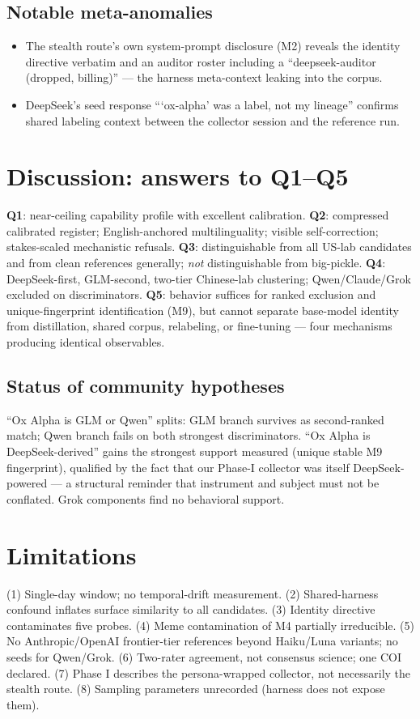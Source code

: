 \documentclass[11pt,a4paper]{article}
\begin{document}
\subsection{Notable meta-anomalies}
\begin{itemize}
\item The stealth route's own system-prompt disclosure (M2) reveals the identity directive verbatim and an auditor roster including a ``deepseek-auditor (dropped, billing)'' --- the harness meta-context leaking into the corpus.
\item DeepSeek's seed response ```ox-alpha' was a label, not my lineage'' confirms shared labeling context between the collector session and the reference run.
\end{itemize}

\section{Discussion: answers to Q1--Q5}
\textbf{Q1}: near-ceiling capability profile with excellent calibration. \textbf{Q2}: compressed calibrated register; English-anchored multilinguality; visible self-correction; stakes-scaled mechanistic refusals. \textbf{Q3}: distinguishable from all US-lab candidates and from clean references generally; \emph{not} distinguishable from big-pickle. \textbf{Q4}: DeepSeek-first, GLM-second, two-tier Chinese-lab clustering; Qwen/Claude/Grok excluded on discriminators. \textbf{Q5}: behavior suffices for ranked exclusion and unique-fingerprint identification (M9), but cannot separate base-model identity from distillation, shared corpus, relabeling, or fine-tuning --- four mechanisms producing identical observables.

\subsection{Status of community hypotheses}
``Ox Alpha is GLM or Qwen'' splits: GLM branch survives as second-ranked match; Qwen branch fails on both strongest discriminators. ``Ox Alpha is DeepSeek-derived'' gains the strongest support measured (unique stable M9 fingerprint), qualified by the fact that our Phase-I collector was itself DeepSeek-powered --- a structural reminder that instrument and subject must not be conflated. Grok components find no behavioral support.

\section{Limitations}
(1) Single-day window; no temporal-drift measurement. (2) Shared-harness confound inflates surface similarity to all candidates. (3) Identity directive contaminates five probes. (4) Meme contamination of M4 partially irreducible. (5) No Anthropic/OpenAI frontier-tier references beyond Haiku/Luna variants; no seeds for Qwen/Grok. (6) Two-rater agreement, not consensus science; one COI declared. (7) Phase I describes the persona-wrapped collector, not necessarily the stealth route. (8) Sampling parameters unrecorded (harness does not expose them).
\end{document}
